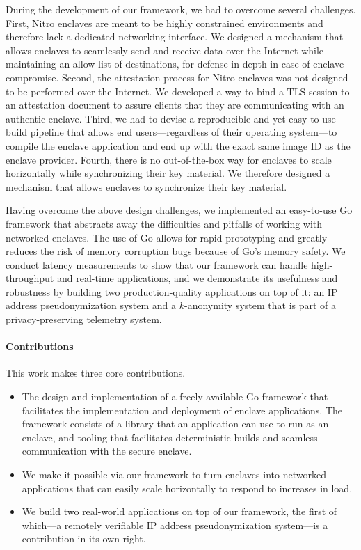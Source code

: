 During the development of our framework, we had to overcome several challenges.
First, Nitro enclaves are meant to be highly constrained environments and
therefore lack a dedicated networking interface.  We designed a mechanism that
allows enclaves to seamlessly send and receive data over the Internet while
maintaining an allow list of destinations, for defense in depth in case of
enclave compromise.
%
Second, the attestation process for Nitro enclaves was not designed to be
performed over the Internet.  We developed a way to bind a TLS session to
an attestation document to assure clients that they are communicating with
an authentic enclave.
%
Third, we had to devise a reproducible and yet easy-to-use build pipeline that
allows end users---regardless of their operating system---to compile the enclave
application and end up with the exact same image ID as the enclave provider.
%
Fourth, there is no out-of-the-box way for enclaves to scale horizontally while
synchronizing their key material.  We therefore designed a mechanism that allows
enclaves to synchronize their key material.

Having overcome the above design challenges, we implemented an easy-to-use Go
framework that abstracts away the difficulties and pitfalls of working with
networked enclaves.  The use of Go allows for rapid prototyping and greatly
reduces the risk of memory corruption bugs because of Go's memory safety.  We
conduct latency measurements to show that our framework can handle
high-throughput and real-time applications, and we demonstrate its usefulness
and robustness by building two production-quality applications on top of it: an
IP address pseudonymization system and a $k$-anonymity system that is part of
a privacy-preserving telemetry system.

\paragraph{Contributions}

This work makes three core contributions.

\begin{itemize}
  \item The design and implementation of a freely available Go framework that
    facilitates the implementation and deployment of enclave applications.  The
    framework consists of a library that an application can use to run as an
    enclave, and tooling that facilitates deterministic builds and seamless
    communication with the secure enclave.

  \item We make it possible via our framework to turn enclaves into networked
    applications that can easily scale horizontally to respond to increases in
    load.

  \item We build two real-world applications on top of our framework, the first
    of which---a remotely verifiable IP address pseudonymization system---is a
    contribution in its own right.
\end{itemize}

